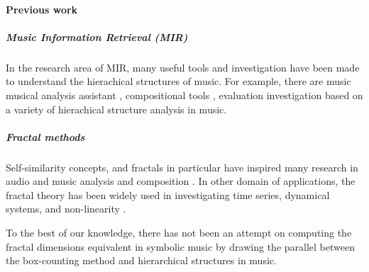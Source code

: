 \documentclass[acmsmall,10pt]{acmart}%
\begin{document}
\paragraph{Previous work}
\subparagraph{Music Information Retrieval (MIR)}
In the research area of MIR, many
useful tools and investigation have been made to understand the hierachical
structures of music. For example, there are music musical analysis assistant \cite{hamanaka2009interactive, hamanaka2005atta}, compositional tools
\cite{hamanaka2004automatic, hamanaka2005automatic}, evaluation investigation \cite{mcfee2017evaluating, mcfee2015hierarchical} based on a variety of hierachical
structure analysis in music.
\subparagraph{Fractal methods}
Self-similarity concepts, and fractals in particular have inspired many research
in audio and music analysis \cite{bigerelle2000fractal,hsu1990fractal,hsu1991self} and composition \cite{sukumaran2009generation,leach1995nature}. In other domain of applications, the fractal theory has
been widely used in investigating time series, dynamical systems, and
non-linearity \cite{accardo1997use, higuchi1988approach}.

To the best of our
knowledge, there has not been an
attempt on computing the fractal dimensions equivalent in symbolic music by
drawing the parallel between the box-counting method and hierarchical structures
in music. 




\end{document}
